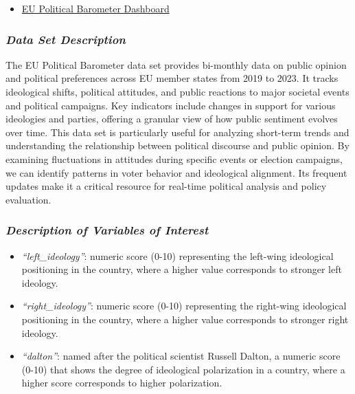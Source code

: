 \documentclass[
]{article}
\providecommand{\tightlist}{%
  \setlength{\itemsep}{0pt}\setlength{\parskip}{0pt}}\usepackage{longtable,booktabs,array}
\begin{document}
\begin{itemize}
\tightlist
\item
  \href{https://eupoliticalbarometer.uc3m.es/dashboard/ideology}{EU
  Political Barometer Dashboard}
\end{itemize}

\subsubsection{\texorpdfstring{\emph{Data Set
Description}}{Data Set Description}}\label{data-set-description-3}

The EU Political Barometer data set provides bi-monthly data on public
opinion and political preferences across EU member states from 2019 to
2023. It tracks ideological shifts, political attitudes, and public
reactions to major societal events and political campaigns. Key
indicators include changes in support for various ideologies and
parties, offering a granular view of how public sentiment evolves over
time. This data set is particularly useful for analyzing short-term
trends and understanding the relationship between political discourse
and public opinion. By examining fluctuations in attitudes during
specific events or election campaigns, we can identify patterns in voter
behavior and ideological alignment. Its frequent updates make it a
critical resource for real-time political analysis and policy
evaluation.

\subsubsection{\texorpdfstring{\emph{Description of Variables of
Interest}}{Description of Variables of Interest}}\label{description-of-variables-of-interest-3}

\begin{itemize}
\tightlist
\item
  \emph{``left\_ideology''}: numeric score (0-10) representing the
  left-wing ideological positioning in the country, where a higher value
  corresponds to stronger left ideology.
\item
  \emph{``right\_ideology''}: numeric score (0-10) representing the
  right-wing ideological positioning in the country, where a higher
  value corresponds to stronger right ideology.
\item
  \emph{``dalton''}: named after the political scientist Russell Dalton,
  a numeric score (0-10) that shows the degree of ideological
  polarization in a country, where a higher score corresponds to higher
  polarization.
\end{itemize}
\end{document}
